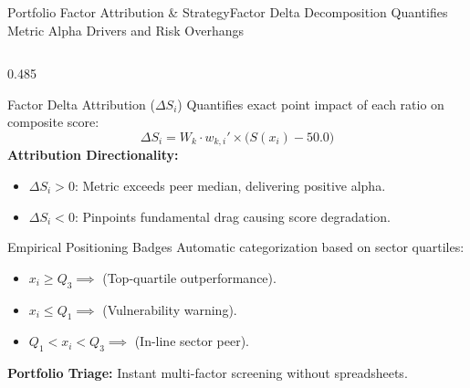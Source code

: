 \begin{frame}{Portfolio Factor Attribution \& Strategy}{Factor Delta Decomposition Quantifies Metric Alpha Drivers and Risk Overhangs}
    \vspace{-0.20cm}
    \begin{columns}[T,onlytextwidth]
        \begin{column}{0.485\textwidth}
            \begin{mathcard}[height=2.74cm]{Factor Delta Attribution ($\Delta S_i$)}
                \fontsize{5.7pt}{6.9pt}\selectfont
                Quantifies exact point impact of each ratio on composite score:
                \begin{equation*}
                    \textstyle \Delta S_i = W_k \cdot w_{k,i}' \times \big(S(x_i) - 50.0\big)
                \end{equation*}
                \textbf{\color{deepemerald}Attribution Directionality:}
                \begin{itemize}
                    \setlength{\itemsep}{0.8pt}
                    \item $\Delta S_i > 0$: Metric exceeds peer median, delivering positive alpha.
                    \item $\Delta S_i < 0$: Pinpoints fundamental drag causing score degradation.
                \end{itemize}
            \end{mathcard}

            \vspace{0.12cm}

            \begin{quantcard}[height=2.74cm]{Empirical Positioning Badges}
                \fontsize{5.5pt}{6.7pt}\selectfont
                Automatic categorization based on sector quartiles:
                \begin{itemize}
                    \setlength{\itemsep}{0.2pt}
                    \item $x_i \ge Q_3 \implies$  (Top-quartile outperformance).
                    \item $x_i \le Q_1 \implies$  (Vulnerability warning).
                    \item $Q_1 < x_i < Q_3 \implies$  (In-line sector peer).
                \end{itemize}
                \vspace{1pt}
                \textbf{\color{deepemerald}Portfolio Triage:} Instant multi-factor screening without spreadsheets.
            \end{quantcard}
        \end{column}


\end{columns}
\end{frame}
